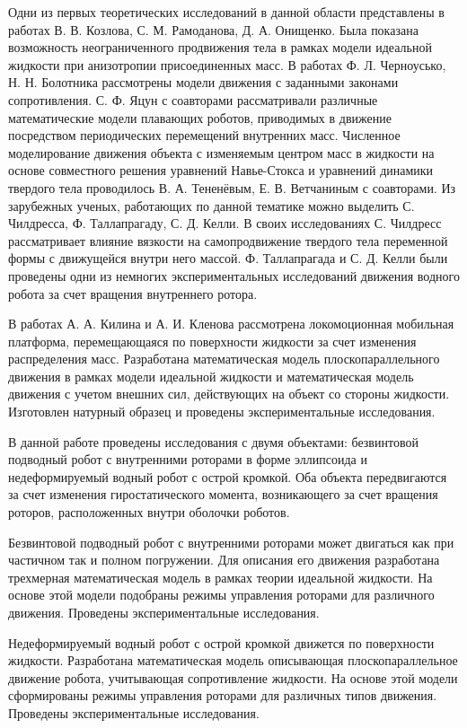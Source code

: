 Одни из первых теоретических исследований в данной области представлены в работах В. В. Козлова, С. М. Рамоданова, Д. А. Онищенко. Была показана возможность неограниченного продвижения тела в рамках модели идеальной жидкости при анизотропии присоединенных масс. В работах Ф. Л. Черноусько, Н. Н. Болотника рассмотрены модели движения с заданными законами сопротивления. С. Ф. Яцун с соавторами рассматривали различные математические модели плавающих роботов, приводимых в движение посредством периодических перемещений внутренних масс. Численное моделирование движения объекта с изменяемым центром масс в жидкости на основе совместного решения уравнений Навье-Стокса и уравнений динамики твердого тела проводилось В. А. Тененёвым, Е. В. Ветчаниным с соавторами. Из зарубежных ученых, работающих по данной тематике можно выделить С. Чилдресса, Ф. Таллапрагаду, С. Д. Келли. %
В своих исследованиях С. Чилдресс рассматривает влияние вязкости на самопродвижение твердого тела переменной формы с движущейся внутри него массой. Ф. Таллапрагада и С. Д. Келли были проведены одни из немногих экспериментальных исследований движения водного робота за счет вращения внутреннего ротора.

В работах А. А. Килина и А. И. Кленова рассмотрена локомоционная мобильная платформа, перемещающаяся по поверхности жидкости за счет изменения распределения масс. Разработана математическая модель плоскопараллельного движения в рамках модели идеальной жидкости и математическая модель движения с учетом внешних сил, действующих на объект со стороны жидкости. Изготовлен натурный образец и проведены экспериментальные исследования.

В данной работе проведены исследования с двумя объектами: безвинтовой подводный робот с внутренними роторами в форме эллипсоида и недеформируемый водный робот с острой кромкой. Оба объекта передвигаются за счет изменения гиростатического момента, возникающего за счет вращения роторов, расположенных внутри оболочки роботов.
 
Безвинтовой подводный робот с внутренними роторами может двигаться как при частичном так и полном погружении. Для описания его движения разработана трехмерная математическая модель в рамках теории идеальной жидкости. На основе этой модели подобраны режимы управления роторами для различного движения. Проведены экспериментальные исследования.

Недеформируемый водный робот с острой кромкой движется по поверхности жидкости. Разработана математическая модель описывающая плоскопараллельное движение робота, учитывающая сопротивление жидкости. На основе этой модели сформированы режимы управления роторами для различных типов движения. Проведены экспериментальные исследования.


